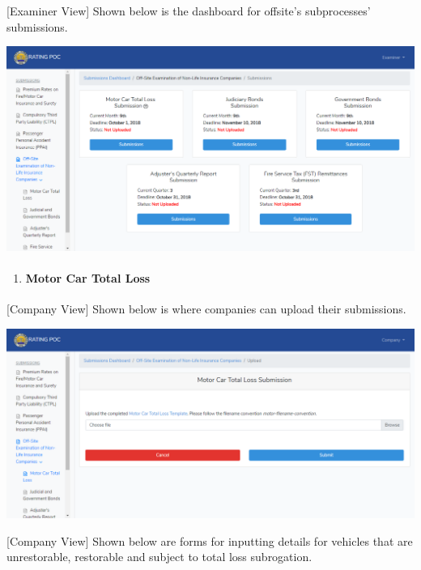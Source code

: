 \documentclass{article}
\begin{document}
[Examiner View] Shown below is the dashboard for
offsite’s subprocesses’ submissions.%

\includegraphics[keepaspectratio=true]{up-ic-screens/image45}{}%

\begin{enumerate}[noitemsep,topsep=\mdcompacttopsep]%

\item{}
\paragraph{Motor Car Total Loss}\label{sec-motor-car-total-loss}%
\end{enumerate}%

\noindent{}[Company View] Shown below is where companies can
upload their submissions.%

\includegraphics[keepaspectratio=true]{up-ic-screens/image8}{}%

[Company View] Shown below are forms for inputting
details for vehicles that are unrestorable, restorable and subject to
total loss subrogation.%
\end{document}
